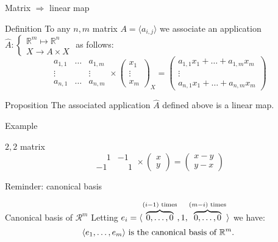\documentclass{beamer}
\begin{document}
\begin{frame}{Matrix $\Rightarrow$ linear map}
  \begin{block}{Definition}
    To any $n,m$ matrix $A = \langle a_{i,j} \rangle$ we associate an application $\hat A : \left \{ \begin{array}{l} \mathbb{R}^m \mapsto \mathbb{R}^n \\ X \rightarrow A \times X \end{array} \right .$ as follows:
    \[
    \begin{array}{|ccc|} a_{1,1} & \dots & a_{1,m}\\ \vdots & & \vdots\\ a_{n,1} & \dots & a_{n, m} \end{array} \times \left ( \begin{array}{c} x_1 \\ \vdots \\ x_m \end{array} \right )_{X} = \left ( \begin{array}{c} a_{1,1}x_1 + \dots + a_{1,m}x_m \\ \vdots \\ a_{n,1}x_1 + \dots + a_{n,m} x_m \end{array} \right )  
    \]  
  \end{block}

  \begin{block}{Proposition}
    The associated application $\hat A$ defined above is a linear map.
  \end{block}
\end{frame}

\begin{frame}{Example}
  \begin{exampleblock}{$2,2$ matrix}
    \[ \begin{array}{|cc|}
      \phantom{-}1 &  -1 \\
      -1 & \phantom{-}1 
    \end{array} \times \left ( \begin{array}{c} x \\ y \end{array} \right ) = \left ( \begin{array}{c} x - y \\ y - x \end{array} \right )  
    \]
  \end{exampleblock}
\end{frame}

\begin{frame}{Reminder: canonical basis}
  \begin{block}{Canonical basis of $\mathcal{R}^m$}
    Letting $e_i = \langle \overbrace{0,\dots,0}^{(i-1) \textnormal{ times}}, 1, \overbrace{0,\dots,0}^{(m-i) \textnormal{ times}} \rangle$ we have: \[\langle e_1, \dots, e_m \rangle \textnormal{ is the canonical basis of } \mathbb{R}^m.\]
  \end{block}
\end{frame}
\end{document}
